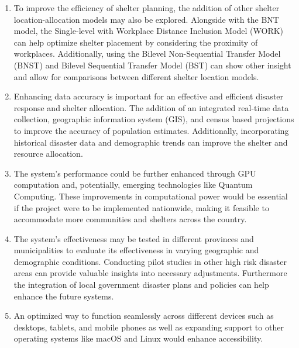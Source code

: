 	\begin{enumerate}
		\item To improve the efficiency of shelter planning, the addition of other shelter location-allocation models may also be explored. Alongside with the BNT model, the Single-level with Workplace Distance Inclusion Model (WORK) can help optimize shelter placement by considering the proximity of workplaces. Additionally, using the Bilevel Non-Sequential Transfer Model (BNST) and Bilevel Sequential Transfer Model (BST) can show other insight and allow for comparisons between different shelter location models.
		\item Enhancing data accuracy is important for an effective and efficient disaster response and shelter allocation. The addition of an integrated real-time data collection, geographic information system (GIS), and census based projections to improve the accuracy of population estimates. Additionally, incorporating historical disaster data and demographic trends can improve the shelter and resource allocation.
		\item The system's performance could be further enhanced through GPU computation and, potentially, emerging technologies like Quantum Computing. These improvements in computational power would be essential if the project were to be implemented nationwide, making it feasible to accommodate more communities and shelters across the country.
		\item The system’s effectiveness may be tested in different provinces and municipalities to evaluate its effectiveness in varying geographic and demographic conditions. Conducting pilot studies in other high risk disaster areas can provide valuable insights into necessary adjustments. Furthermore the integration of local government disaster plans and policies can help enhance the future systems.
		\item An optimized way to function seamlessly across different devices such as desktops, tablets, and mobile phones as well as expanding support to other operating systems like macOS and Linux would enhance accessibility.
	\end{enumerate}
	
